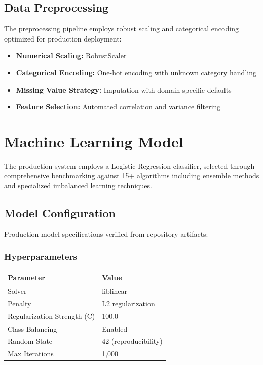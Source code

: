 \documentclass[11pt]{article}
\begin{document}
\subsection{Data Preprocessing}
The preprocessing pipeline employs robust scaling and categorical encoding optimized for production deployment:

\begin{itemize}[leftmargin=*]
\item \textbf{Numerical Scaling:} RobustScaler
\item \textbf{Categorical Encoding:} One-hot encoding with unknown category handling
\item \textbf{Missing Value Strategy:} Imputation with domain-specific defaults
\item \textbf{Feature Selection:} Automated correlation and variance filtering
\end{itemize}

\section{Machine Learning Model}
The production system employs a Logistic Regression classifier, selected through comprehensive benchmarking against 15+ algorithms including ensemble methods and specialized imbalanced learning techniques.

\subsection{Model Configuration}
Production model specifications verified from repository artifacts:

\subsubsection{Hyperparameters}
\begin{center}
\begin{tabular}{l l}
\toprule
\textbf{Parameter} & \textbf{Value} \\
\midrule
Solver & liblinear \\
Penalty & L2 regularization \\
Regularization Strength (C) & 100.0 \\
Class Balancing & Enabled \\
Random State & 42 (reproducibility) \\
Max Iterations & 1,000 \\
\bottomrule
\end{tabular}
\end{center}
\end{document}
